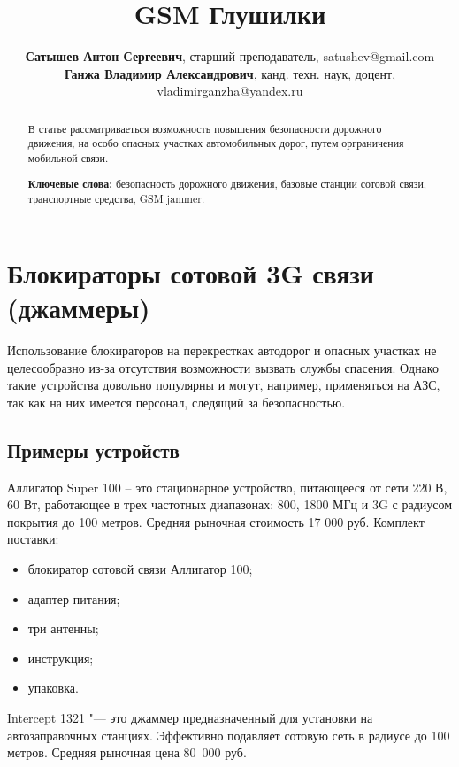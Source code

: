 \documentclass{article}
\author{{\small \textbf{Сатышев Антон Сергеевич}, старший преподаватель, satushev@gmail.com}\\
	    {\small \textbf{Ганжа Владимир Александрович}, канд. техн. наук, доцент, vladimirganzha@yandex.ru}}
\title{GSM Глушилки}
\date{}
\begin{document}
	\maketitle
	\thispagestyle{empty}%

	\begin{abstract}
		В статье рассматриваеться возможность повышения безопасности дорожного движения, на особо опасных участках автомобильных дорог, путем орграничения мобильной связи.
		
		\textbf{Ключевые слова:} безопасность дорожного движения, базовые станции сотовой связи, транспортные средства, GSM jammer.
	\end{abstract}

	\section{Блокираторы сотовой 3G связи (джаммеры)}

	Использование блокираторов на перекрестках автодорог и опасных участках не целесообразно из-за отсутствия возможности вызвать службы спасения. Однако такие устройства довольно популярны и могут, например, применяться на АЗС, так как на них имеется персонал, следящий за безопасностью.

	\subsection{Примеры устройств}

	Аллигатор Super 100 – это стационарное устройство, питающееся от сети 220 В, 60 Вт, работающее в трех частотных диапазонах: 800, 1800 МГц и 3G с радиусом покрытия до 100 метров. Средняя рыночная стоимость 17 000 руб.
	Комплект поставки: 
	\begin{itemize}
		\item блокиратор сотовой связи Аллигатор 100;
		\item адаптер питания;
		\item три антенны;
		\item инструкция;
		\item упаковка.
	\end{itemize}
	
	Intercept 1321 "--- это джаммер предназначенный для установки на автозаправочных станциях. Эффективно подавляет сотовую сеть в радиусе до 100 метров.
	Средняя рыночная цена 80~000 руб.
\end{document}
